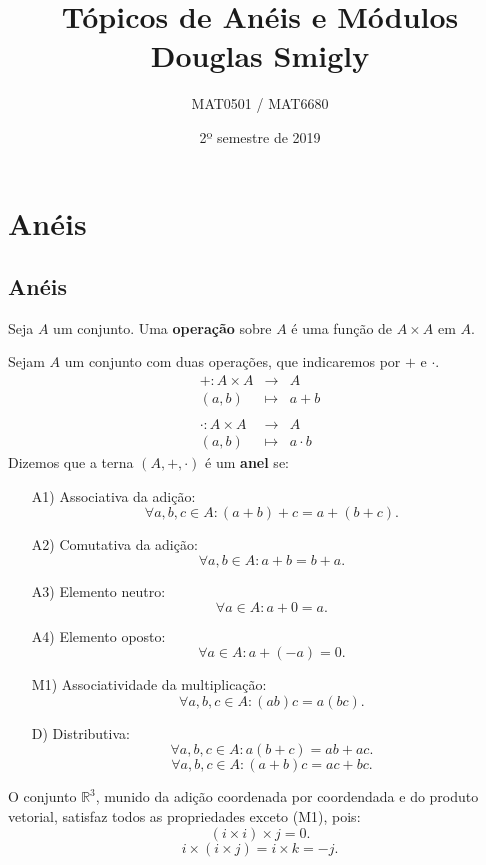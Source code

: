 \documentclass[11pt,twoside,a4paper]{book}
\title{Tópicos de Anéis e Módulos \\  Douglas Smigly}
\author{MAT0501 / MAT6680}
\date{2º semestre de 2019}
\begin{document}
\maketitle

\tableofcontents

\newpage

\chapter{Anéis}



\section{Anéis}

\begin{definicao}
Seja $A$ um conjunto. Uma \textbf{operação} sobre $A$ é uma função de $A\times A$ em $A$.
\end{definicao}

\begin{definicao}
Sejam $A$ um conjunto com duas operações, que indicaremos por $+$ e $\cdot$.
\[
\begin{array}{rcl}

+:A\times A&\rightarrow&A \\ (a,b)&\mapsto&a+b \\ \\
\cdot:A\times A&\rightarrow&A \\ (a,b)&\mapsto&a\cdot b
\end{array}
\]
Dizemos que a terna $(A,+,\cdot)$ é um \textbf{anel} se:
\begin{itemize}
\item[A1)] Associativa da adição:
\[
\forall a,b,c\in A:(a+b)+c=a+(b+c).
\]
\item[A2)] Comutativa da adição:
\[
\forall a,b\in A:a+b=b+a.
\]
\item[A3)] Elemento neutro:
\[
\forall a\in A:a+0=a.
\]
\item[A4)] Elemento oposto:
\[
\forall a\in A:a+(-a)=0.
\]
\item[M1)] Associatividade da multiplicação:
\[
\forall a,b,c\in A:(ab)c=a(bc).
\]
\item[D)] Distributiva:
\[
\forall a,b,c\in A:a(b+c)=ab+ac.
\]
\[
\forall a,b,c\in A:(a+b)c=ac+bc.
\]
\end{itemize}
\end{definicao}

\begin{contraexemplo}
O conjunto $\mathbb{R}^3$, munido da adição coordenada por coordendada e do produto vetorial, satisfaz todos as propriedades exceto (M1), pois:
\[
(i\times i)\times j=0.
\]
\[
i\times(i\times j)=i\times k=-j.
\]
\end{contraexemplo}
\end{document}
